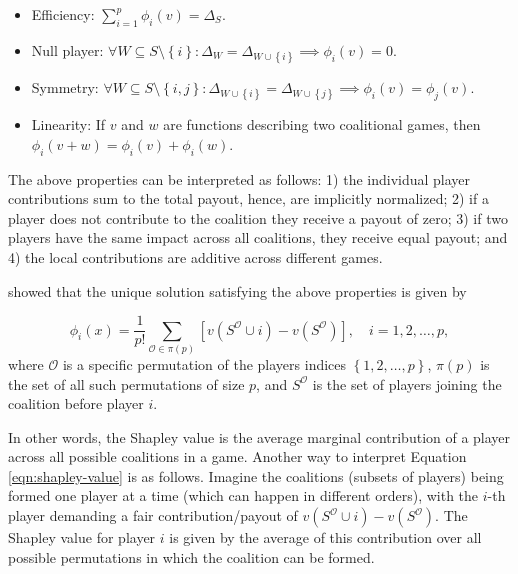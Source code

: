 \begin{itemize}

  \item Efficiency: $\sum_{i = 1} ^ p \phi_i\left(v\right) = \Delta_S $.
  
  \item Null player: $\forall W \subseteq S \setminus \left\{i\right\}: \Delta_W = \Delta_{W \cup \left\{i\right\}} \implies \phi_i\left(v\right) = 0$.
  
  \item Symmetry: $\forall W \subseteq S \setminus \left\{i, j\right\}: \Delta_{W \cup \left\{i\right\}} = \Delta_{W \cup \left\{j\right\}} \implies \phi_i\left(v\right) = \phi_j\left(v\right)$.
  
  \item Linearity: If $v$ and $w$ are functions describing two coalitional games, then $\phi_i\left(v + w\right) = \phi_i\left(v\right) + \phi_i\left(w\right)$.

\end{itemize}

The above properties can be interpreted as follows: 1) the individual
player contributions sum to the total payout, hence, are implicitly
normalized; 2) if a player does not contribute to the coalition they
receive a payout of zero; 3) if two players have the same impact across
all coalitions, they receive equal payout; and 4) the local
contributions are additive across different games.

\citep{shapley-2016-value} showed that the unique solution satisfying
the above properties is given by

\begin{equation}
\label{eqn:shapley-value}
\phi_i\left(x\right) = \frac{1}{p!} \sum_{\mathcal{O} \in \pi\left(p\right)} \left[v\left(S^\mathcal{O} \cup i\right) - v\left(S^\mathcal{O}\right)\right], \quad i = 1, 2, \dots, p,
\end{equation} where \(\mathcal{O}\) is a specific permutation of the
players indices \(\left\{1, 2, \dots, p\right\}\), \(\pi\left(p\right)\)
is the set of all such permutations of size \(p\), and \(S^\mathcal{O}\)
is the set of players joining the coalition before player \(i\).

In other words, the Shapley value is the average marginal contribution
of a player across all possible coalitions in a game. Another way to
interpret Equation \eqref{eqn:shapley-value} is as follows. Imagine the
coalitions (subsets of players) being formed one player at a time (which
can happen in different orders), with the \(i\)-th player demanding a
fair contribution/payout of
\(v\left(S^\mathcal{O} \cup i\right) - v\left(S^\mathcal{O}\right)\).
The Shapley value for player \(i\) is given by the average of this
contribution over all possible permutations in which the coalition can
be formed.

